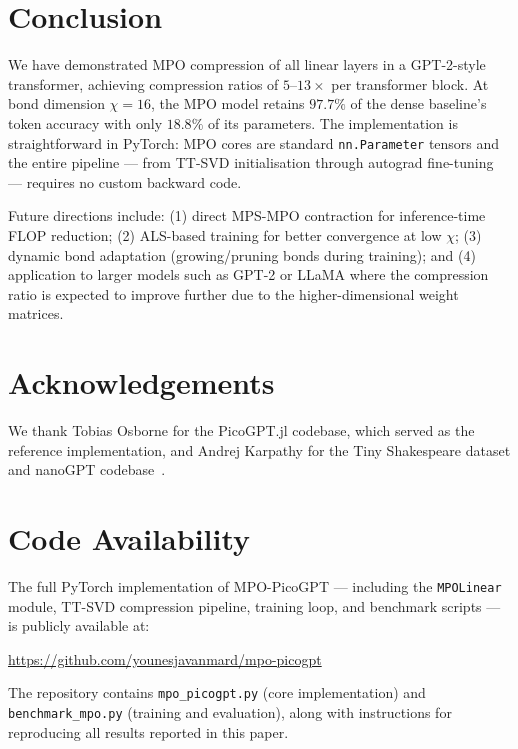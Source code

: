 \documentclass[11pt,a4paper]{article}
\theoremstyle{definition}
\begin{document}
\section{Conclusion}

We have demonstrated MPO compression of all linear layers in a GPT-2-style transformer, achieving compression ratios of $5\text{--}13\times$ per transformer block. At bond dimension $\chi=16$, the MPO model retains $97.7\%$ of the dense baseline's token accuracy with only $18.8\%$ of its parameters. The implementation is straightforward in PyTorch: MPO cores are standard \texttt{nn.Parameter} tensors and the entire pipeline — from TT-SVD initialisation through autograd fine-tuning — requires no custom backward code.

Future directions include: (1) direct MPS-MPO contraction for inference-time FLOP reduction; (2) ALS-based training for better convergence at low $\chi$; (3) dynamic bond adaptation (growing/pruning bonds during training); and (4) application to larger models such as GPT-2 or LLaMA where the compression ratio is expected to improve further due to the higher-dimensional weight matrices.


\section*{Acknowledgements}
We thank Tobias Osborne for the PicoGPT.jl codebase, which served as the reference implementation, and Andrej Karpathy for the Tiny Shakespeare dataset and nanoGPT codebase~\citep{karpathy2022nanogpt}.

\section*{Code Availability}
The full PyTorch implementation of MPO-PicoGPT --- including the \texttt{MPOLinear} module, TT-SVD compression pipeline, training loop, and benchmark scripts --- is publicly available at:
\begin{center}
  \url{https://github.com/younesjavanmard/mpo-picogpt}
\end{center}
The repository contains \texttt{mpo\_picogpt.py} (core implementation) and \texttt{benchmark\_mpo.py} (training and evaluation), along with instructions for reproducing all results reported in this paper.
\end{document}
